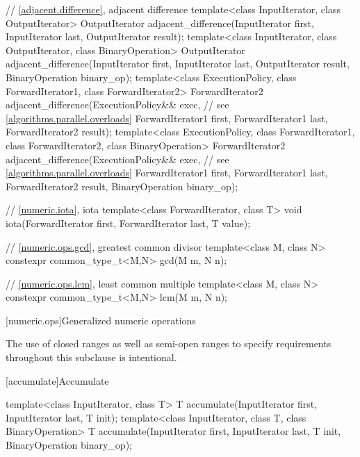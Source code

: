 \begin{codeblock}
{  // \ref{adjacent.difference}, adjacent difference
  template<class InputIterator, class OutputIterator>
    OutputIterator adjacent_difference(InputIterator first,
                                       InputIterator last,
                                       OutputIterator result);
  template<class InputIterator, class OutputIterator, class BinaryOperation>
    OutputIterator adjacent_difference(InputIterator first,
                                       InputIterator last,
                                       OutputIterator result,
                                       BinaryOperation binary_op);
  template<class ExecutionPolicy, class ForwardIterator1, class ForwardIterator2>
    ForwardIterator2 adjacent_difference(ExecutionPolicy&& exec, // see \ref{algorithms.parallel.overloads}
                                         ForwardIterator1 first,
                                         ForwardIterator1 last,
                                         ForwardIterator2 result);
  template<class ExecutionPolicy, class ForwardIterator1, class ForwardIterator2,
           class BinaryOperation>
    ForwardIterator2 adjacent_difference(ExecutionPolicy&& exec, // see \ref{algorithms.parallel.overloads}
                                         ForwardIterator1 first,
                                         ForwardIterator1 last,
                                         ForwardIterator2 result,
                                         BinaryOperation binary_op);

  // \ref{numeric.iota}, iota
  template<class ForwardIterator, class T>
    void iota(ForwardIterator first, ForwardIterator last, T value);

  // \ref{numeric.ops.gcd}, greatest common divisor
  template<class M, class N>
    constexpr common_type_t<M,N> gcd(M m, N n);

  // \ref{numeric.ops.lcm}, least common multiple
  template<class M, class N>
    constexpr common_type_t<M,N> lcm(M m, N n);
}
\end{codeblock}

[numeric.ops]{Generalized numeric operations}

\pnum
\begin{note}
The use of closed ranges as well as semi-open ranges to specify requirements
throughout this subclause is intentional.
\end{note}

[accumulate]{Accumulate}

%
\begin{itemdecl}
template<class InputIterator, class T>
  T accumulate(InputIterator first, InputIterator last, T init);
template<class InputIterator, class T, class BinaryOperation>
  T accumulate(InputIterator first, InputIterator last, T init,
               BinaryOperation binary_op);
\end{itemdecl}

